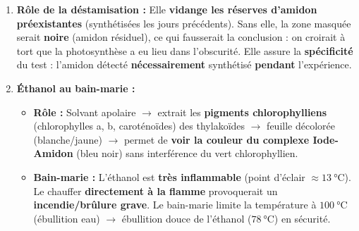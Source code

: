 \documentclass[11pt]{article}
\begin{document}
\begin{exoresolu}
\begin{enumerate}
\begin{itemize}
            \end{itemize}
        \item \textbf{Rôle de la déstamisation :} Elle \textbf{vidange les réserves d'amidon préexistantes} (synthétisées les jours précédents). Sans elle, la zone masquée serait \textbf{noire} (amidon résiduel), ce qui fausserait la conclusion : on croirait à tort que la photosynthèse a eu lieu dans l'obscurité. Elle assure la \textbf{spécificité} du test : l'amidon détecté \textbf{nécessairement} synthétisé \textbf{pendant} l'expérience.
        \item \textbf{Éthanol au bain-marie :}
            \begin{itemize}
                \item \textbf{Rôle :} Solvant apolaire $\rightarrow$ extrait les \textbf{pigments chlorophylliens} (chlorophylles a, b, caroténoïdes) des thylakoïdes $\rightarrow$ feuille décolorée (blanche/jaune) $\rightarrow$ permet de \textbf{voir la couleur du complexe Iode-Amidon} (bleu noir) sans interférence du vert chlorophyllien.
                \item \textbf{Bain-marie :} L'éthanol est \textbf{très inflammable} (point d'éclair $\approx \SI{13}{\celsius}$). Le chauffer \textbf{directement à la flamme} provoquerait un \textbf{incendie/brûlure grave}. Le bain-marie limite la température à $\SI{100}{\celsius}$ (ébullition eau) $\rightarrow$ ébullition douce de l'éthanol ($\SI{78}{\celsius}$) en sécurité.
            \end{itemize}
    \end{enumerate}
\end{exoresolu}
\end{document}
